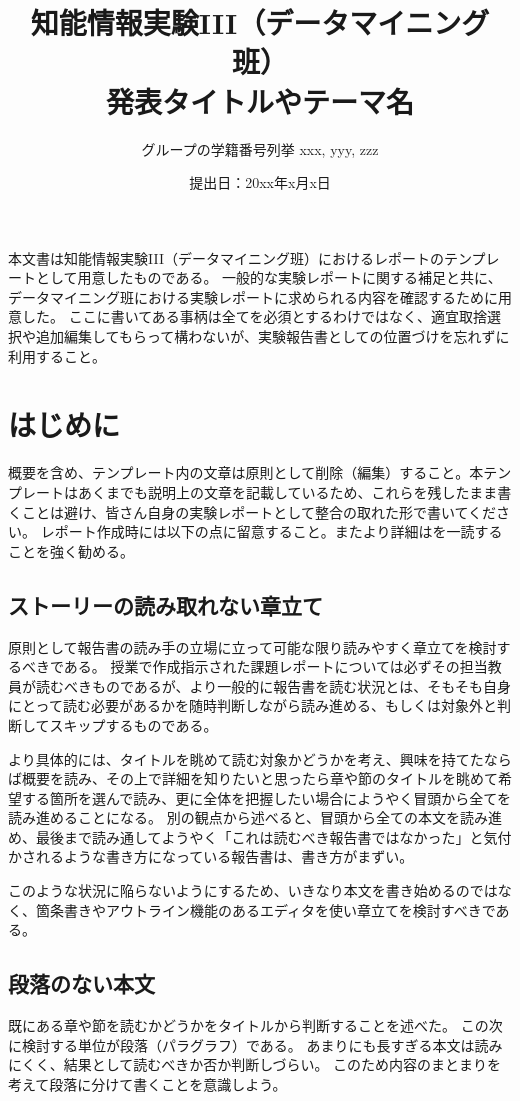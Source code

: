 \documentclass[a4paper, 11pt, titlepage]{jsarticle}
\title{知能情報実験III（データマイニング班）\\発表タイトルやテーマ名}
\author{グループの学籍番号列挙 xxx, yyy, zzz}
\date{提出日：20xx年x月x日}
\begin{document}
\maketitle
\tableofcontents
\clearpage

本文書は知能情報実験III（データマイニング班）におけるレポートのテンプレートとして用意したものである。
一般的な実験レポートに関する補足と共に、データマイニング班における実験レポートに求められる内容を確認するために用意した。
ここに書いてある事柄は全てを必須とするわけではなく、適宜取捨選択や追加編集してもらって構わないが、実験報告書としての位置づけを忘れずに利用すること。

\section{はじめに}
概要を含め、テンプレート内の文章は原則として削除（編集）すること。本テンプレートはあくまでも説明上の文章を記載しているため、これらを残したまま書くことは避け、皆さん自身の実験レポートとして整合の取れた形で書いてください。
レポート作成時には以下の点に留意すること。またより詳細は\cite{kanazawa}を一読することを強く勧める。

\subsection{ストーリーの読み取れない章立て}
原則として報告書の読み手の立場に立って可能な限り読みやすく章立てを検討するべきである。
授業で作成指示された課題レポートについては必ずその担当教員が読むべきものであるが、より一般的に報告書を読む状況とは、そもそも自身にとって読む必要があるかを随時判断しながら読み進める、もしくは対象外と判断してスキップするものである。

より具体的には、タイトルを眺めて読む対象かどうかを考え、興味を持てたならば概要を読み、その上で詳細を知りたいと思ったら章や節のタイトルを眺めて希望する箇所を選んで読み、更に全体を把握したい場合にようやく冒頭から全てを読み進めることになる。
別の観点から述べると、冒頭から全ての本文を読み進め、最後まで読み通してようやく「これは読むべき報告書ではなかった」と気付かされるような書き方になっている報告書は、書き方がまずい。

このような状況に陥らないようにするため、いきなり本文を書き始めるのではなく、箇条書きやアウトライン機能のあるエディタを使い章立てを検討すべきである。

\subsection{段落のない本文}
既にある章や節を読むかどうかをタイトルから判断することを述べた。
この次に検討する単位が段落（パラグラフ）である。
あまりにも長すぎる本文は読みにくく、結果として読むべきか否か判断しづらい。
このため内容のまとまりを考えて段落に分けて書くことを意識しよう。
\end{document}
